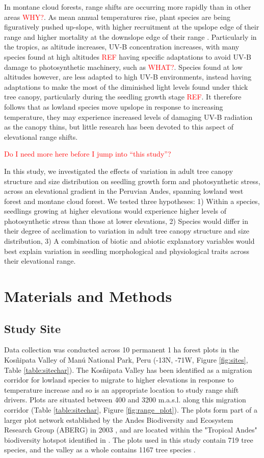 \documentclass[a4paper,11pt]{article}
\newcommand{\todo}[1]{\textcolor{red}{#1}}   %
\begin{document}
In montane cloud forests, range shifts are occurring more rapidly than in other areas \citep{} \todo{WHY?}. As mean annual temperatures rise, plant species are being figuratively pushed up-slope, with higher recruitment at the upslope edge of their range and higher mortality at the downslope edge of their range \citep{}. Particularly in the tropics, as altitude increases, UV-B concentration increases, with many species found at high altitudes \todo{REF} having specific adaptations to avoid UV-B damage to photosynthetic machinery, such as \todo{WHAT?}. Species found at low altitudes however, are less adapted to high UV-B environments, instead having adaptations to make the most of the diminished light levels found under thick tree canopy, particularly during the seedling growth stage \todo{REF}. It therefore follows that as lowland species move upslope in response to increasing temperature, they may experience increased levels of damaging UV-B radiation as the canopy thins, but little research has been devoted to this aspect of elevational range shifts.  

\todo{Do I need more here before I jump into ``this study''?}

In this study, we investigated the effects of variation in adult tree canopy structure and size distribution on seedling growth form and photosynthetic stress, across an elevational gradient in the Peruvian Andes, spanning lowland west forest and montane cloud forest. We tested three hypotheses: 1) Within a species, seedlings growing at higher elevations would experience higher levels of photosynthetic stress than those at lower elevations, 2) Species would differ in their degree of acclimation to variation in adult tree canopy structure and size distribution, 3) A combination of biotic and abiotic explanatory variables would best explain variation in seedling morphological and physiological traits across their elevational range.  

\section{Materials and Methods}
\subsection{Study Site}
Data collection was conducted across 10 permanent 1 ha forest plots in the Kos\~{n}ipata Valley of Man\'{u} National Park, Peru (-13\textdegree N, -71\textdegree W, Figure \ref{fig:sites}, Table \ref{table:sitechar}). The Kos\~{n}ipata Valley has been identified as a migration corridor for lowland species to migrate to higher elevations in response to temperature increase \citep{Feeley2011} and so is an appropriate location to study range shift drivers. Plots are situated between 400 and 3200 m.a.s.l. along this migration corridor (Table \ref{table:sitechar}, Figure \ref{fig:range_plot}). The plots form part of a larger plot network established by the Andes Biodiversity and Ecosystem Research Group (ABERG) in 2003 \citep{Malhi2010, Girardin2013a}, and are located within the "Tropical Andes" biodiversity hotspot identified in \citet{Myers2000}. The plots used in this study contain 719 tree species, and the valley as a whole contains 1167 tree species \citep{}.
\end{document}
